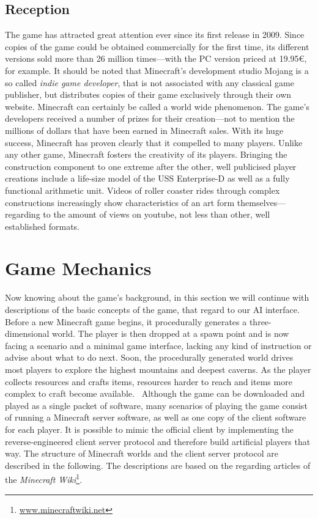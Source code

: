         \subsection{Reception}
The game has attracted great attention ever since its first release in 2009. Since copies of the game could be obtained commercially for the first time, its different versions sold more than 26 million times---with the PC version priced at 19.95\euro, for example. It should be noted that Minecraft's development studio Mojang is a so called \emph{indie game developer}, that is not associated with any classical game publisher, but distributes copies of their game exclusively through their own website. Minecraft can certainly be called a world wide phenomenon. The game's developers received a number of prizes for their creation---not to mention the millions of dollars that have been earned in Minecraft sales. With its huge success, Minecraft has proven clearly that it compelled to many players. Unlike any other game, Minecraft fosters the creativity of its players. Bringing the construction component to one extreme after the other, well publicised player creations include a life-size model of the USS Enterprise-D as well as a fully functional arithmetic unit. Videos of roller coaster rides through complex constructions increasingly show characteristics of an art form themselves---regarding to the amount of views on youtube, not less than other, well established formats.

    \section{Game Mechanics}
Now knowing about the game's background, in this section we will continue with descriptions of the basic concepts of the game, that regard to our AI interface.  Before a new Minecraft game begins, it procedurally generates a three-dimensional world. The player is then dropped at a spawn point and is now facing a scenario and a minimal game interface, lacking any kind of instruction or advise about what to do next. Soon, the procedurally generated world drives most players to explore the highest mountains and deepest caverns. As the player collects resources and crafts items, resources harder to reach and items more complex to craft become available.~\cite{Duncan:2011:MBC:2207096.2207097} Although the game can be downloaded and played as a single packet of software, many scenarios of playing the game consist of running a Minecraft server software, as well as one copy of the client software for each player. It is possible to mimic the official client by implementing the reverse-engineered client server protocol and therefore build artificial players that way. The structure of Minecraft worlds and the client server protocol are described in the following. The descriptions are based on the regarding articles of the \emph{Minecraft Wiki}\footnote{\url{www.minecraftwiki.net}}.

